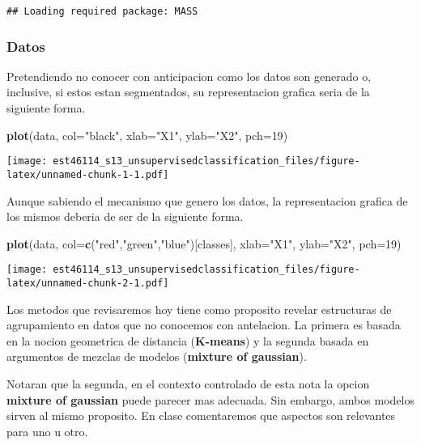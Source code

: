 \documentclass[11pt,]{article}
\newenvironment{Shaded}{\begin{snugshade}}{\end{snugshade}}
\newcommand{\KeywordTok}[1]{\textcolor[rgb]{0.13,0.29,0.53}{\textbf{#1}}}
\newcommand{\DataTypeTok}[1]{\textcolor[rgb]{0.13,0.29,0.53}{#1}}
\newcommand{\DecValTok}[1]{\textcolor[rgb]{0.00,0.00,0.81}{#1}}
\newcommand{\StringTok}[1]{\textcolor[rgb]{0.31,0.60,0.02}{#1}}
\newcommand{\NormalTok}[1]{#1}
\begin{document}
\begin{verbatim}
## Loading required package: MASS
\end{verbatim}

\subsubsection{Datos}\label{datos}

Pretendiendo no conocer con anticipacion como los datos son generado o,
inclusive, si estos estan segmentados, su representacion grafica seria
de la siguiente forma.

\begin{Shaded}
\begin{Highlighting}[]
\KeywordTok{plot}\NormalTok{(data, }\DataTypeTok{col=}\StringTok{"black"}\NormalTok{, }\DataTypeTok{xlab=}\StringTok{"X1"}\NormalTok{, }\DataTypeTok{ylab=}\StringTok{"X2"}\NormalTok{, }\DataTypeTok{pch=}\DecValTok{19}\NormalTok{)}
\end{Highlighting}
\end{Shaded}

\texttt{[image: est46114\_s13\_unsupervisedclassification\_files/figure-latex/unnamed-chunk-1-1.pdf]}

Aunque sabiendo el mecanismo que genero los datos, la representacion
grafica de los mismos deberia de ser de la siguiente forma.

\begin{Shaded}
\begin{Highlighting}[]
\KeywordTok{plot}\NormalTok{(data, }\DataTypeTok{col=}\KeywordTok{c}\NormalTok{(}\StringTok{"red"}\NormalTok{,}\StringTok{"green"}\NormalTok{,}\StringTok{"blue"}\NormalTok{)[classes], }\DataTypeTok{xlab=}\StringTok{"X1"}\NormalTok{, }\DataTypeTok{ylab=}\StringTok{"X2"}\NormalTok{, }\DataTypeTok{pch=}\DecValTok{19}\NormalTok{)}
\end{Highlighting}
\end{Shaded}

\texttt{[image: est46114\_s13\_unsupervisedclassification\_files/figure-latex/unnamed-chunk-2-1.pdf]}

Los metodos que revisaremos hoy tiene como proposito revelar estructuras
de agrupamiento en datos que no conocemos con antelacion. La primera es
basada en la nocion geometrica de distancia (\textbf{K-means}) y la
segunda basada en argumentos de mezclas de modelos (\textbf{mixture of
gaussian}).

Notaran que la segunda, en el contexto controlado de esta nota la opcion
\textbf{mixture of gaussian} puede parecer mas adecuada. Sin embargo,
ambos modelos sirven al mismo proposito. En clase comentaremos que
aspectos son relevantes para uno u otro.
\end{document}
